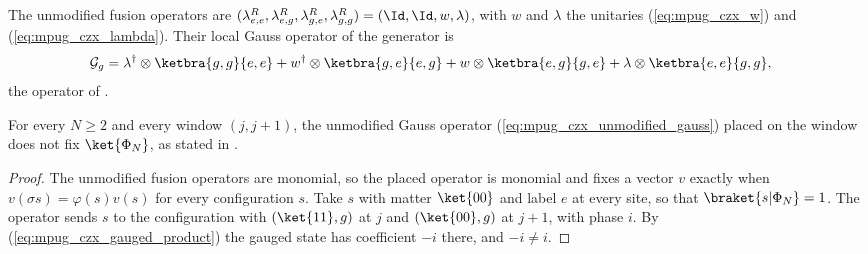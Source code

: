 \begin{definition}
    \label{def:mpug_czx_unmodified_tuple}
    \leanok
    The unmodified fusion operators are
    $(\lambda^R_{e,e},\lambda^R_{e,g},\lambda^R_{g,e},\lambda^R_{g,g})
        =(\Id,\Id,w,\lambda)$, with $w$ and $\lambda$ the unitaries
    (\ref{eq:mpug_czx_w}) and (\ref{eq:mpug_czx_lambda}). Their local Gauss
    operator of the generator is
    \begin{align}
        \mathcal G_g
         & =\lambda^\dagger\otimes\ketbra{g,g}{e,e}
        +w^\dagger\otimes\ketbra{g,e}{e,g}
        +w\otimes\ketbra{e,g}{g,e}
        +\lambda\otimes\ketbra{e,e}{g,g},
        \label{eq:mpug_czx_unmodified_gauss}
    \end{align}
    the operator of \cite[lines~5121--5128]{FrancoRubio2025MPUGauging}.
\end{definition}

\begin{lemma}
    \label{thm:mpug_czx_unmodified_not_invariant}
    \leanok
    For every $N\geq2$ and every window $(j,j+1)$, the unmodified Gauss
    operator (\ref{eq:mpug_czx_unmodified_gauss}) placed on the window does not
    fix $\ket{\Phi_N}$, as stated in
    \cite[line~5179]{FrancoRubio2025MPUGauging}.
\end{lemma}

\begin{proof}\leanok
    The unmodified fusion operators are monomial, so the placed operator is
    monomial and fixes a vector $v$ exactly when $v(\sigma s)=\varphi(s)v(s)$
    for every configuration $s$. Take $s$ with matter $\ket{00}$ and label $e$
    at every site, so that $\braket{s|\Phi_N}=1$. The operator sends $s$ to the
    configuration with $(\ket{11},g)$ at $j$ and $(\ket{00},g)$ at $j+1$, with
    phase $i$. By (\ref{eq:mpug_czx_gauged_product}) the gauged state has
    coefficient $-i$ there, and $-i\neq i$.
\end{proof}


